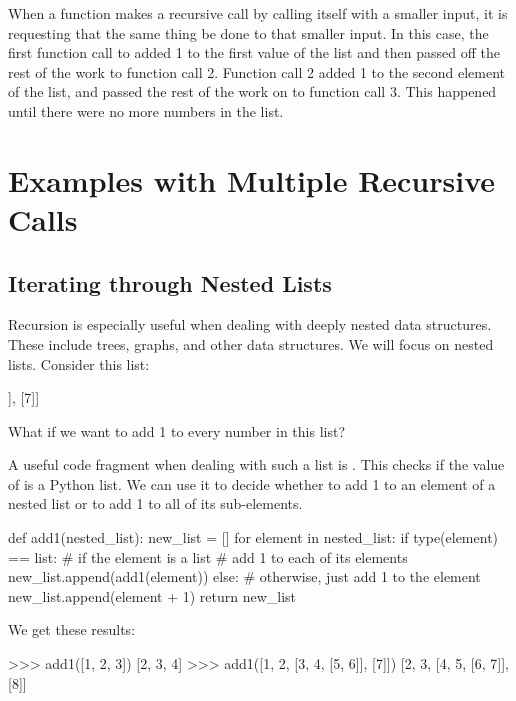 \documentclass[11pt]{cselabheader}
\begin{document}
When a function makes a recursive call by calling itself with a smaller input,
it is requesting that the same thing be done to that smaller input.
In this case, the first function call to  added 1 to the
first value of the list and then passed off the rest of the work to
function call 2. Function call 2 added 1 to the second element of the list,
and passed the rest of the work on to function call 3. This happened until
there were no more numbers in the list.

\section{Examples with Multiple Recursive Calls}
\subsection{Iterating through Nested Lists}

Recursion is especially useful when dealing with deeply nested data structures.
These include trees, graphs, and other data structures. We will focus on
nested lists. Consider this list:

\begin{python3code}
[1, 2, [3, 4, [5, 6]], [7]]
\end{python3code}

What if we want to add 1 to every number in this list?

A useful code fragment when dealing with such a list is
.  This checks if the value of
 is a Python list.  We can use it to decide
whether to add 1 to an element of a nested list or to add 1 to all of
its sub-elements.

\begin{python3code}
def add1(nested_list):
    new_list = []
    for element in nested_list:
        if type(element) == list:
            # if the element is a list
            # add 1 to each of its elements
            new_list.append(add1(element))
        else:
            # otherwise, just add 1 to the element
            new_list.append(element + 1)
    return new_list
\end{python3code}

We get these results:

\begin{python3code}
>>> add1([1, 2, 3])
[2, 3, 4]
>>> add1([1, 2, [3, 4, [5, 6]], [7]])
[2, 3, [4, 5, [6, 7]], [8]]
\end{python3code}
\end{document}
